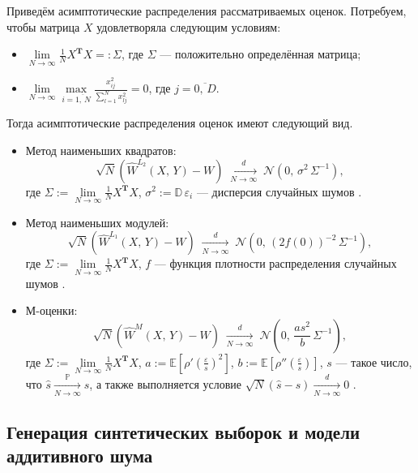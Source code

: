 \documentclass[12pt,a4paper]{article}
\newcommand{\tran}{\mathbf{T}}
\newcommand{\probability}{\mathbb{P}}
\newcommand{\expectation}{\mathbb{E}}
\newcommand{\dispersion}{\mathbb{D}}
\newcommand{\normallaw}{\mathcal{N}}
\begin{document}
	Приведём асимптотические распределения рассматриваемых оценок. Потребуем, чтобы матрица $X$ удовлетворяла следующим условиям:
	\begin{itemize}
		\item $\lim\limits_{N\to\infty} \frac1N X^\tran X =: \Sigma$, где $\Sigma$ --- положительно определённая матрица;
		\item $\lim\limits_{N\to\infty} \max\limits_{i=\overline{1,\,N}} \frac { x_{ij}^2 } { \sum_{l=1}^N x_{lj}^2 } = 0$, где $j=\overline{0,\,D}$.
	\end{itemize}
	Тогда асимптотические распределения оценок имеют следующий вид.
	\begin{itemize}
		\item Метод наименьших квадратов:
		\begin{equation*}
			\sqrt{N} (\widehat{W}^{L_2}(X,\,Y)-W) \;\mathop{\longrightarrow}\limits^{d}_{N\to\infty}\; \normallaw \left( 0, \, \sigma^2\,\Sigma^{-1} \right)\!,
		\end{equation*}
		где $\Sigma := \lim\limits_{N\to\infty} \frac1N X^\tran X$, $\sigma^2 := \dispersion\,\varepsilon_i$ --- дисперсия случайных шумов \cite{reg, asympt1}.
		\item Метод наименьших модулей:
		\begin{equation*}
			\sqrt{N} (\widehat{W}^{L_1}(X,\,Y)-W) \;\mathop{\longrightarrow}\limits^{d}_{N\to\infty}\; \normallaw \left( 0, \, (2f(0))^{-2}\,\Sigma^{-1} \right)\!,
		\end{equation*}
		где $\Sigma := \lim\limits_{N\to\infty} \frac1N X^\tran X$, $f$ --- функция плотности распределения случайных шумов \cite{reg, asympt2, asympt3, asympt4}.
		\item М-оценки:
		\begin{equation*}
			\sqrt{N} (\widehat{W}^{M}(X,\,Y)-W) \;\mathop{\longrightarrow}\limits^{d}_{N\to\infty}\; \normallaw \left( 0, \, \frac{as^2}{b}\,\Sigma^{-1} \right)\!,
		\end{equation*}
		где $\Sigma := \lim\limits_{N\to\infty} \frac1N X^\tran X$, $a := \expectation \left[ \rho'(\frac{\varepsilon}{s})^2 \right]$, $b := \expectation \left[ \rho''(\frac{\varepsilon}{s}) \right]$, $s$ --- такое число, что $\widehat{s} \mathop{\longrightarrow}\limits^{\probability}_{N\to\infty} s$, а также выполняется условие $\sqrt{N} (\widehat{s}-s) \mathop{\longrightarrow}\limits^{d}_{N\to\infty} 0$ \cite{reg, asympt5}.
	\end{itemize}
	
	\newpage
	\begin{center}
		\section{Генерация синтетических выборок и модели аддитивного шума}
	\end{center}
	
\end{document}
